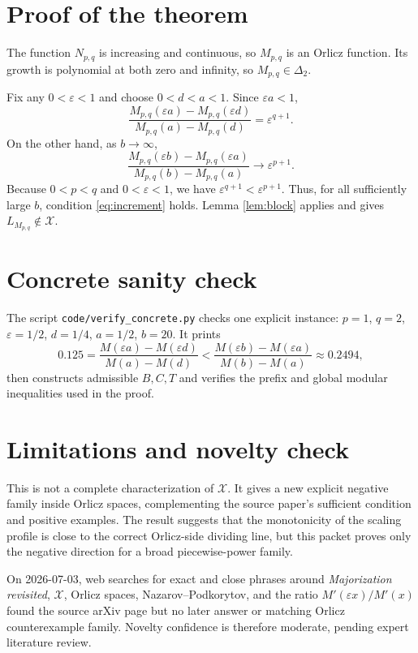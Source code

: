 \documentclass[11pt]{article}
\newcommand{\Xclass}{\mathcal X}
\begin{document}
\section*{Proof of the theorem}

The function $N_{p,q}$ is increasing and continuous, so $M_{p,q}$ is an Orlicz
function. Its growth is polynomial at both zero and infinity, so
$M_{p,q}\in\Delta_2$.

Fix any $0<\varepsilon<1$ and choose $0<d<a<1$. Since
$\varepsilon a<1$,
\[
\frac{M_{p,q}(\varepsilon a)-M_{p,q}(\varepsilon d)}
     {M_{p,q}(a)-M_{p,q}(d)}
=\varepsilon^{q+1}.
\tag{7}
\]
On the other hand, as $b\to\infty$,
\[
\frac{M_{p,q}(\varepsilon b)-M_{p,q}(\varepsilon a)}
     {M_{p,q}(b)-M_{p,q}(a)}
\longrightarrow \varepsilon^{p+1}.
\tag{8}
\]
Because $0<p<q$ and $0<\varepsilon<1$, we have
$\varepsilon^{q+1}<\varepsilon^{p+1}$. Thus, for all sufficiently large $b$,
condition \eqref{eq:increment} holds. Lemma \ref{lem:block} applies and gives
$L_{M_{p,q}}\notin\Xclass$.

\section*{Concrete sanity check}

The script \texttt{code/verify\_concrete.py} checks one explicit instance:
$p=1$, $q=2$, $\varepsilon=1/2$, $d=1/4$, $a=1/2$, $b=20$. It prints
\[
0.125=
\frac{M(\varepsilon a)-M(\varepsilon d)}{M(a)-M(d)}
<
\frac{M(\varepsilon b)-M(\varepsilon a)}{M(b)-M(a)}
\approx 0.2494,
\]
then constructs admissible $B,C,T$ and verifies the prefix and global modular
inequalities used in the proof.

\section*{Limitations and novelty check}

This is not a complete characterization of $\Xclass$. It gives a new explicit
negative family inside Orlicz spaces, complementing the source paper's
sufficient condition and positive examples. The result suggests that the
monotonicity of the scaling profile is close to the correct Orlicz-side
dividing line, but this packet proves only the negative direction for a broad
piecewise-power family.

On 2026-07-03, web searches for exact and close phrases around
\emph{Majorization revisited}, $\Xclass$, Orlicz spaces, Nazarov--Podkorytov,
and the ratio $M'(\varepsilon x)/M'(x)$ found the source arXiv page but no
later answer or matching Orlicz counterexample family. Novelty confidence is
therefore moderate, pending expert literature review.
\end{document}
